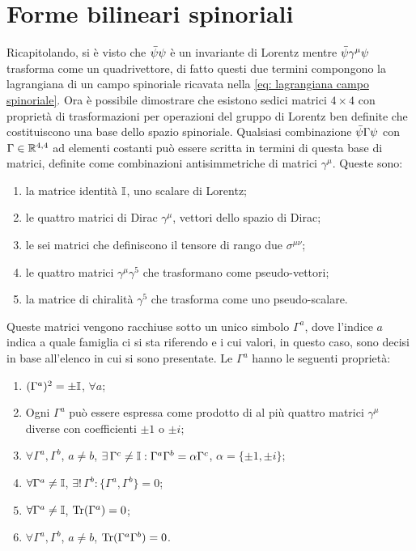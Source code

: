 \section{Forme bilineari spinoriali}
Ricapitolando, si è visto che $\bar{\psi}\psi$ è un invariante di Lorentz mentre $\bar{\psi}\gamma^\mu\psi$ trasforma come un quadrivettore, di fatto questi due termini compongono la lagrangiana di un campo spinoriale ricavata nella \eqref{eq: lagrangiana campo spinoriale}. Ora è possibile dimostrare che esistono sedici matrici $4\times4$ con proprietà di trasformazioni per operazioni del gruppo di Lorentz ben definite che costituiscono una base dello spazio spinoriale. Qualsiasi combinazione $\bar{\psi}\Gamma\psi$ con $\Gamma\in\mathbb{R}^{4,4}$ ad elementi costanti può essere scritta in termini di questa base di matrici, definite come combinazioni antisimmetriche di matrici $\gamma^\mu$. Queste sono:
\begin{enumerate}
    \item la matrice identità $\mathbb{I}$, uno scalare di Lorentz;
    \item le quattro matrici di Dirac $\gamma^\mu$, vettori dello spazio di Dirac;
    \item le sei matrici che definiscono il tensore di rango due $\sigma^{\mu\nu}$;
    \item le quattro matrici $\gamma^\mu\gamma^5$ che trasformano come pseudo-vettori;
    \item la matrice di chiralità $\gamma^5$ che trasforma come uno pseudo-scalare.
\end{enumerate}
Queste matrici vengono racchiuse sotto un unico simbolo $\Gamma^a$, dove l'indice $a$ indica a quale famiglia ci si sta riferendo e i cui valori, in questo caso, sono decisi in base all'elenco in cui si sono presentate. Le $\Gamma^a$ hanno le seguenti proprietà:
\begin{enumerate}
    \item $(\Gamma^a)^2 = \pm\mathbb{I}$, $\forall a$;
    \item Ogni $\Gamma^a$ può essere espressa come prodotto di al più quattro matrici $\gamma^\mu$ diverse con coefficienti $\pm1$ o $\pm i$;
    \item $\forall\Gamma^a,\Gamma^b$, $a\neq b$, $\exists\,\Gamma^c\neq\mathbb{I} : \Gamma^a\Gamma^b = \alpha\Gamma^c$, $\alpha = \{\pm1,\pm i\}$;
    \item $\forall\Gamma^a\neq\mathbb{I}$, $\exists!\,\Gamma^b : \{\Gamma^a,\Gamma^b\} = 0$;
    \item $\forall\Gamma^a\neq\mathbb{I}$, $\textnormal{Tr}{(\Gamma^a)} = 0$;
    \item $\forall\Gamma^a,\Gamma^b$, $a\neq b$, $\textnormal{Tr}{(\Gamma^a\Gamma^b)} = 0$.
\end{enumerate}
